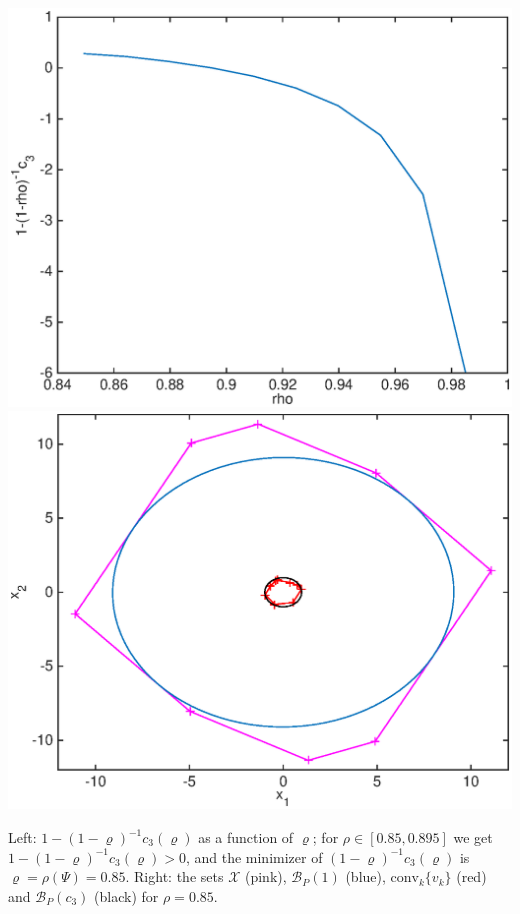 \documentclass[11pt, oneside]{article}
\def\X{\mathcal{X}}
\def\B{\mathscr{B}}
\def\conv{\mathrm{conv}}
\begin{document}
\centerline{\includegraphics[scale=0.5]{./tmp/obj_rho}
\hspace{-10mm}\includegraphics[scale=0.5]{./tmp/sets}}

Left: $1 - (1-\varrho)^{-1}c_3(\varrho)$ as a function of $\varrho$; for $\rho \in [0.85, 0.895]$ we get $1 - (1-\varrho)^{-1}c_3(\varrho) > 0$, and the minimizer of $(1-\varrho)^{-1}c_3(\varrho) $ is $\varrho = \rho(\Psi) = 0.85$. Right: the sets $\X$ (pink), $\B_P(1)$ (blue), $\conv_k \{ v_k \}$ (red) and $\B_P(c_3)$ (black) for $\rho=0.85$.
\end{document}
